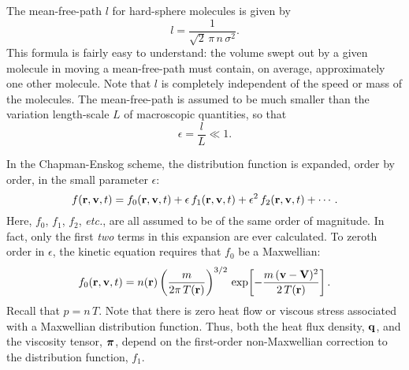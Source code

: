 The mean-free-path $l$ for  hard-sphere molecules is given by
\begin{equation}\label{e3.57}
l = \frac{1}{\sqrt{2}\,\pi\,n\,\sigma^2}.
\end{equation}
This formula is fairly easy to understand: the volume swept out by a given molecule
in moving a mean-free-path must contain, on average, approximately one
other molecule. Note that $l$ is completely independent of the speed or
mass of the molecules. The mean-free-path is assumed to be much
smaller than the variation length-scale $L$ of macroscopic quantities,
so that
\begin{equation}
\epsilon = \frac{l}{L} \ll 1.
\end{equation}

In the Chapman-Enskog scheme, the distribution function is expanded, order by order,
in the small parameter $\epsilon$:
\begin{equation}
f({\bf r}, {\bf v}, t) = f_0({\bf r}, {\bf v}, t) + \epsilon\,f_1({\bf r}, {\bf v}, t) + \epsilon^2\, f_2({\bf r}, {\bf v}, t) + \cdots.
\end{equation}
Here, $f_0$, $f_1$, $f_2$, {\em etc.}, are all assumed to be of the same order of
magnitude. In fact, only the first {\em two}\/ terms in this expansion are ever
calculated. 
To zeroth order in $\epsilon$, the kinetic equation requires that $f_0$ be
a Maxwellian:
\begin{equation}
f_0({\bf r}, {\bf v}, t) = n({\bf r})
\left(\frac{m}{2\pi\,T({\bf r})}\right)^{3/2}\,\exp\!\left[-\frac{m\,({\bf v}-
{\bf V})^2}
{2\,T({\bf r})}\right].
\end{equation}
Recall that $p=n\,T$. Note that there is zero heat flow or viscous stress associated
with a Maxwellian distribution function. Thus, both the heat flux density, 
${\bf q}$,
and the viscosity tensor, $\mbox{\boldmath$\pi$}$, depend on the first-order 
non-Maxwellian correction
to the distribution function, $f_1$. 

